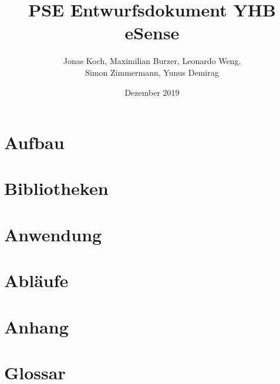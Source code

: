 \documentclass[12pt,a4paper,titlepage,ngerman]{article}
\title{PSE Entwurfsdokument YHB eSense}
\author{Jonas Koch, Maximilian Burzer, Leonardo Weng, \\ Simon Zimmermann, Yunus Demirag}
\date{Dezember 2019}
\begin{document}
	
	\part{Aufbau}
	
	\part{Bibliotheken}
	
	
	\part{Anwendung}
	
	
	
	\part{Abläufe}
	
	\part{Anhang}
	
	\part{Glossar}
	
\end{document}
